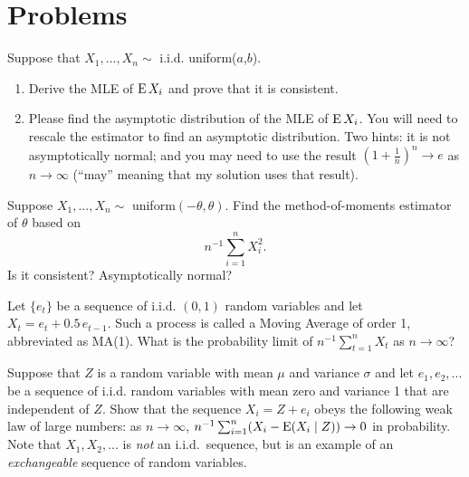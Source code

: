

\chapter{Problems}

\begin{hw}
  Suppose that $X_1,...,X_n \sim$ i.i.d. uniform($a$,$b$).
  \begin{enumerate}
  \item Derive the MLE of $\operatorname{E} X_i$ and prove that it is consistent.
  \item Please find the asymptotic distribution of the MLE of $\operatorname{E}
    X_i$. You will need to rescale the estimator to find an
    asymptotic distribution. Two hints: it is not asymptotically
    normal; and you may need to use the result $(1 + \tfrac{1}{n})^n \to
    e$ as $n \to \infty$ (``may'' meaning that my solution uses that result).
  \end{enumerate}
\end{hw}

\begin{hw}
  Suppose $X_1,...,X_n \sim$ uniform$(-\theta, \theta)$. Find the
  method-of-moments estimator of $\theta$ based on
  \begin{equation*}
    n^{-1} \sum_{i=1}^n X_i^2.
  \end{equation*}
  Is it consistent? Asymptotically normal?
\end{hw}

\begin{hw}
  Let $\{e_t\}$ be a sequence of i.i.d. $(0,1)$ random variables
  and let $X_t = e_t + 0.5\, e_{t-1}$. Such a process is called a
  Moving Average of order 1, abbreviated as MA(1). What is the
  probability limit of $n^{-1} \sum_{t=1}^n X_t$ as $n \to \infty$?
\end{hw}

\begin{hw}
  Suppose that $Z$ is a random variable with mean $\mu$ and variance
  $\sigma$ and let $e_1,e_2,...$ be a sequence of i.i.d. random
  variables with mean zero and variance 1 that are independent of $Z$.
  Show that the sequence $X_i = Z + e_i$ obeys the following weak law
  of large numbers: as $n \to \infty$, $n^{-1} \sum_{i=1}^n ( X_i -
  \operatorname{E}(X_i \mid Z) ) \to 0$ in probability. Note that $X_1,X_2,...$ is
  \emph{not} an i.i.d.\ sequence, but is an example of an
  \emph{exchangeable} sequence of random variables.
\end{hw}

